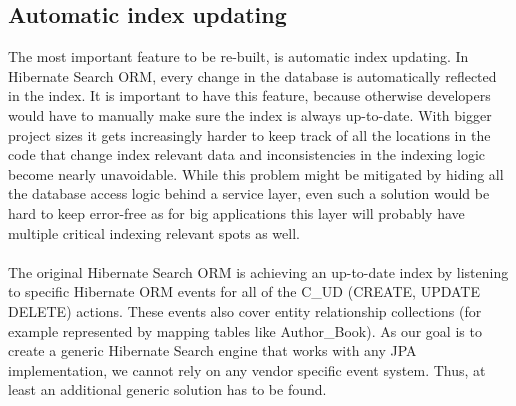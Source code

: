 \subsection{Automatic index updating} \label{automatic_indexing_problematic_intro}
The most important feature to be re-built, is automatic index updating. In Hibernate Search ORM, every change in the database is automatically reflected in the index. It is important to have this feature, because otherwise developers would have to manually make sure the index is always up-to-date. With bigger project sizes it gets increasingly harder to keep track of all the locations in the code that change index relevant data and inconsistencies in the indexing logic become nearly unavoidable. While this problem might be mitigated by hiding all the database access logic behind a service layer, even such a solution would be hard to keep error-free as for big applications this layer will probably have multiple critical indexing relevant spots as well.
\\\\
The original Hibernate Search ORM is achieving an up-to-date index by listening to specific Hibernate ORM events for all of the C\_UD (CREATE, UPDATE DELETE) actions. These events also cover entity relationship collections (for example represented by mapping tables like Author\_Book). As our goal is to create a generic Hibernate Search engine that works with any JPA implementation, we cannot rely on any vendor specific event system. Thus, at least an additional generic solution has to be found.


\pagebreak